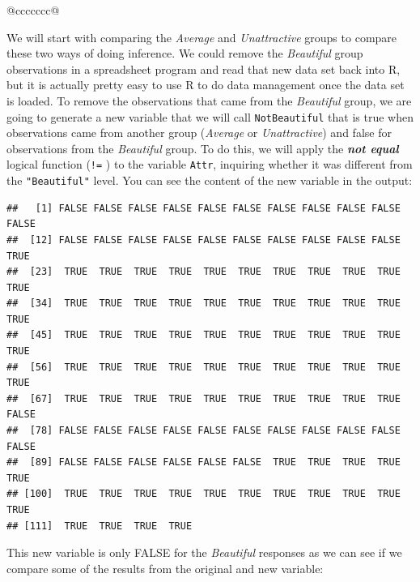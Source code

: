 \documentclass[]{book}
\newenvironment{Shaded}{\begin{snugshade}}{\end{snugshade}}
\newcommand{\KeywordTok}[1]{\textcolor[rgb]{0.13,0.29,0.53}{\textbf{#1}}}
\newcommand{\StringTok}[1]{\textcolor[rgb]{0.31,0.60,0.02}{#1}}
\newcommand{\OperatorTok}[1]{\textcolor[rgb]{0.81,0.36,0.00}{\textbf{#1}}}
\newcommand{\NormalTok}[1]{#1}
\theoremstyle{definition}
\theoremstyle{definition}
\theoremstyle{remark}
\begin{document}
\begin{longtable}[]{@{}ccccccc@{}}
\begin{minipage}[b]{0.10\columnwidth}
We will start with comparing the \emph{Average} and \emph{Unattractive}
groups to compare these two ways of doing inference. We could remove the
\emph{Beautiful} group observations in a spreadsheet program and read
that new data set back into R, but it is actually pretty easy to use R
to do data management once the data set is loaded. To remove the
observations that came from the \emph{Beautiful} group, we are going to
generate a new variable that we will call \texttt{NotBeautiful} that is
true when observations came from another group (\emph{Average} or
\emph{Unattractive}) and false for observations from the
\emph{Beautiful} group. To do this, we will apply the \textbf{\emph{not
equal}} logical function (\texttt{!=} ) to the variable \texttt{Attr},
inquiring whether it was different from the \texttt{"Beautiful"} level.
You can see the content of the new variable in the output:

\begin{Shaded}
\end{Shaded}

\begin{verbatim}
##   [1] FALSE FALSE FALSE FALSE FALSE FALSE FALSE FALSE FALSE FALSE FALSE
##  [12] FALSE FALSE FALSE FALSE FALSE FALSE FALSE FALSE FALSE FALSE  TRUE
##  [23]  TRUE  TRUE  TRUE  TRUE  TRUE  TRUE  TRUE  TRUE  TRUE  TRUE  TRUE
##  [34]  TRUE  TRUE  TRUE  TRUE  TRUE  TRUE  TRUE  TRUE  TRUE  TRUE  TRUE
##  [45]  TRUE  TRUE  TRUE  TRUE  TRUE  TRUE  TRUE  TRUE  TRUE  TRUE  TRUE
##  [56]  TRUE  TRUE  TRUE  TRUE  TRUE  TRUE  TRUE  TRUE  TRUE  TRUE  TRUE
##  [67]  TRUE  TRUE  TRUE  TRUE  TRUE  TRUE  TRUE  TRUE  TRUE  TRUE FALSE
##  [78] FALSE FALSE FALSE FALSE FALSE FALSE FALSE FALSE FALSE FALSE FALSE
##  [89] FALSE FALSE FALSE FALSE FALSE FALSE  TRUE  TRUE  TRUE  TRUE  TRUE
## [100]  TRUE  TRUE  TRUE  TRUE  TRUE  TRUE  TRUE  TRUE  TRUE  TRUE  TRUE
## [111]  TRUE  TRUE  TRUE  TRUE
\end{verbatim}

This new variable is only FALSE for the \emph{Beautiful} responses as we
can see if we compare some of the results from the original and new
variable:

\begin{Shaded}
\end{Shaded}


\end{minipage}
\end{longtable}
\end{document}
